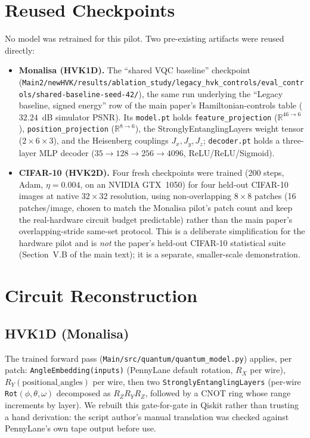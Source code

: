\documentclass[11pt]{article}
\begin{document}
\section{Reused Checkpoints}
No model was retrained for this pilot. Two pre-existing artifacts were reused directly:
\begin{itemize}
    \item \textbf{Monalisa (HVK1D).} The ``shared VQC baseline'' checkpoint (\texttt{Main2/newHVK/results/ablation\_study/legacy\_hvk\_controls/eval\_controls/shared-baseline-seed-42/}), the same run underlying the ``Legacy baseline, signed energy'' row of the main paper's Hamiltonian-controls table ($32.24$~dB simulator PSNR). Its \texttt{model.pt} holds \texttt{feature\_projection} ($\mathbb{R}^{46\to6}$), \texttt{position\_projection} ($\mathbb{R}^{8\to6}$), the StronglyEntanglingLayers weight tensor ($2\times6\times3$), and the Heisenberg couplings $J_x,J_y,J_z$; \texttt{decoder.pt} holds a three-layer MLP decoder ($35\to128\to256\to4096$, ReLU/ReLU/Sigmoid).
    \item \textbf{CIFAR-10 (HVK2D).} Four fresh checkpoints were trained (200 steps, Adam, $\eta=0.004$, on an NVIDIA GTX~1050) for four held-out CIFAR-10 images at native $32\times32$ resolution, using non-overlapping $8\times8$ patches (16 patches/image, chosen to match the Monalisa pilot's patch count and keep the real-hardware circuit budget predictable) rather than the main paper's overlapping-stride same-set protocol. This is a deliberate simplification for the hardware pilot and is \emph{not} the paper's held-out CIFAR-10 statistical suite (Section~V.B of the main text); it is a separate, smaller-scale demonstration.
\end{itemize}

\section{Circuit Reconstruction}
\subsection{HVK1D (Monalisa)}
The trained forward pass (\texttt{Main/src/quantum/quantum\_model.py}) applies, per patch: \texttt{AngleEmbedding(inputs)} (PennyLane default rotation, $R_X$ per wire), $R_Y(\text{positional\_angles})$ per wire, then two \texttt{StronglyEntanglingLayers} (per-wire \texttt{Rot}$(\phi,\theta,\omega)$ decomposed as $R_Z R_Y R_Z$, followed by a CNOT ring whose range increments by layer). We rebuilt this gate-for-gate in Qiskit rather than trusting a hand derivation: the script author's manual translation was checked against PennyLane's own tape output before use.
\end{document}

